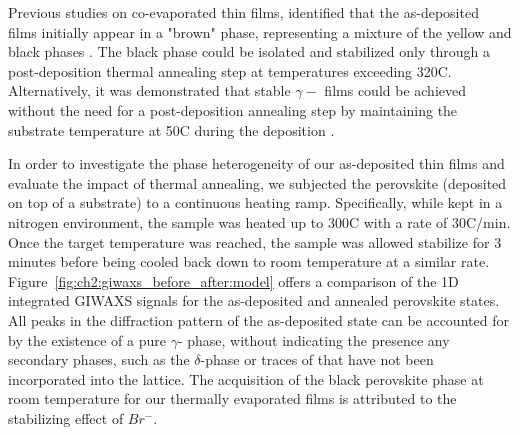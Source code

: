 Previous studies on co-evaporated  thin films, identified that the as-deposited films initially appear in a "brown" phase, representing a mixture of the yellow and black phases \cite{Frolova2017HighlyPbI2, PintorMonroy2021All-EvaporatedApplications}. The black phase could be isolated and stabilized only through a post-deposition thermal annealing step at temperatures exceeding 320\degree C. Alternatively, it was demonstrated that stable $\gamma-$ films could be achieved without the need for a post-deposition annealing step by maintaining the substrate temperature at 50\degree C during the deposition \cite{Dong2021High-TemperatureCells}. 

In order to investigate the phase heterogeneity of our as-deposited  thin films and evaluate the impact of thermal annealing, we subjected the perovskite (deposited on top of a  substrate) to a continuous heating ramp. Specifically, while kept in a nitrogen environment, the sample was heated up to 300\degree C with a rate of 30\degree C/min. Once the target temperature was reached, the sample was allowed stabilize for 3 minutes before being cooled back down to room temperature at a similar rate. Figure~\ref{fig:ch2:giwaxs_before_after:model} offers a comparison of the 1D integrated GIWAXS signals for the as-deposited and annealed perovskite states. All peaks in the diffraction pattern of the as-deposited state can be accounted for by the existence of a pure $\gamma$- phase, without indicating the presence any secondary phases, such as the $\delta$-phase or traces of  that have not been incorporated into the lattice. The acquisition of the black perovskite phase at room temperature for our thermally evaporated films is attributed to the stabilizing effect of $Br^-$. 

